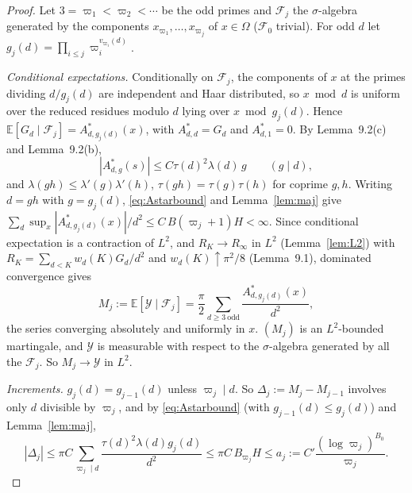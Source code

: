 \documentclass[11pt]{amsart}
\theoremstyle{remark}
\newcommand{\E}{\mathbb{E}}
\begin{document}
\begin{proof}
Let $3=\varpi_1<\varpi_2<\cdots$ be the odd primes and $\mathcal F_j$ the $\sigma$-algebra generated by the components $x_{\varpi_1},\dots,x_{\varpi_j}$ of $x\in\Omega$ ($\mathcal F_0$ trivial). For odd $d$ let $g_j(d)=\prod_{i\le j}\varpi_i^{v_{\varpi_i}(d)}$.

\emph{Conditional expectations.} Conditionally on $\mathcal F_j$, the components of $x$ at the primes dividing $d/g_j(d)$ are independent and Haar distributed, so $x\bmod d$ is uniform over the reduced residues modulo $d$ lying over $x\bmod g_j(d)$. Hence $\E[G_d\mid\mathcal F_j]=A^*_{d,g_j(d)}(x)$, with $A^*_{d,d}=G_d$ and $A^*_{d,1}=0$. By Lemma~9.2(c) and Lemma~9.2(b),
\begin{equation}\label{eq:Astarbound}
|A^*_{d,g}(s)|\le C\tau(d)^2\lambda(d)\,g\qquad(g\mid d),
\end{equation}
and $\lambda(gh)\le\lambda'(g)\lambda'(h)$, $\tau(gh)=\tau(g)\tau(h)$ for coprime $g,h$. Writing $d=gh$ with $g=g_j(d)$, \eqref{eq:Astarbound} and Lemma~\ref{lem:maj} give $\sum_d\sup_x|A^*_{d,g_j(d)}(x)|/d^2\le C\,B(\varpi_j+1)H<\infty$. Since conditional expectation is a contraction of $L^2$, and $R_K\to R_\infty$ in $L^2$ (Lemma~\ref{lem:L2}) with $R_K=\sum_{d<K}w_d(K)G_d/d^2$ and $w_d(K)\uparrow\pi^2/8$ (Lemma~9.1), dominated convergence gives
\[
M_j:=\E[\mathcal Y\mid\mathcal F_j]=\frac\pi2\sum_{d\ge3\ \mathrm{odd}}\frac{A^*_{d,g_j(d)}(x)}{d^2},
\]
the series converging absolutely and uniformly in $x$. $(M_j)$ is an $L^2$-bounded martingale, and $\mathcal Y$ is measurable with respect to the $\sigma$-algebra generated by all the $\mathcal F_j$. So $M_j\to\mathcal Y$ in $L^2$.

\emph{Increments.} $g_j(d)=g_{j-1}(d)$ unless $\varpi_j\mid d$. So $\Delta_j:=M_j-M_{j-1}$ involves only $d$ divisible by $\varpi_j$, and by \eqref{eq:Astarbound} (with $g_{j-1}(d)\le g_j(d)$) and Lemma~\ref{lem:maj},
\[
|\Delta_j|\le\pi C\sum_{\varpi_j\mid d}\frac{\tau(d)^2\lambda(d)g_j(d)}{d^2}\le\pi C\,B_{\varpi_j}H\le a_j:=C'\frac{(\log\varpi_j)^{B_0}}{\varpi_j}.
\]


\end{proof}
\end{document}
